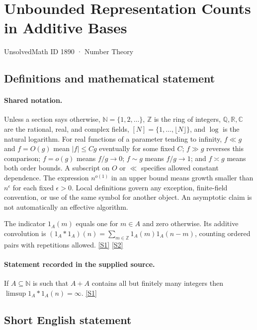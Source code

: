 \documentclass[11pt,a4paper]{article}
\newcommand{\N}{\mathbb{N}}
\newcommand{\Z}{\mathbb{Z}}
\newcommand{\Q}{\mathbb{Q}}
\newcommand{\R}{\mathbb{R}}
\newcommand{\C}{\mathbb{C}}
\newcommand{\sref}[2]{\hyperlink{source:#1:#2}{[S#2]}}
\begin{document}

\setcounter{section}{1889}

\section{Unbounded Representation Counts in Additive Bases}\label{1890}

{\small\sffamily UnsolvedMath ID 1890 · Number Theory}

\subsection{Definitions and mathematical statement}

\paragraph{Shared notation.}Unless a section says otherwise, $\N=\{1,2,\ldots\}$,
$\Z$ is the ring of integers, $\Q,\R,\C$ are the rational, real, and complex
fields, $[N]=\{1,\ldots,\lfloor N\rfloor\}$, and $\log$ is the natural
logarithm. For real functions of a parameter tending to infinity,
$f\ll g$ and $f=O(g)$ mean $|f|\leq Cg$ eventually for some fixed $C$;
$f\gg g$ reverses this comparison; $f=o(g)$ means $f/g\to0$;
$f\sim g$ means $f/g\to1$; and $f\asymp g$ means both order bounds.
A subscript on $O$ or $\ll$ specifies allowed constant dependence.
The expression $n^{o(1)}$ in an upper bound means growth smaller than
$n^\epsilon$ for each fixed $\epsilon>0$. Local definitions govern any
exception, finite-field convention, or use of the same symbol for another
object. An asymptotic claim is not automatically an effective algorithm.



The indicator $1_A(m)$ equals one for $m\in A$ and zero otherwise. Its additive convolution is $(1_A*1_A)(n)=\sum_{m\in\Z}1_A(m)1_A(n-m)$, counting ordered pairs with repetitions allowed. \sref{1890}{1} \sref{1890}{2}

\paragraph{Statement recorded in the supplied source.}
If $A\subseteq \mathbb{N}$ is such that $A+A$ contains all but finitely many integers then $\limsup 1_A\ast 1_A(n)=\infty$. \sref{1890}{1}

\subsection{Short English statement}
\end{document}
